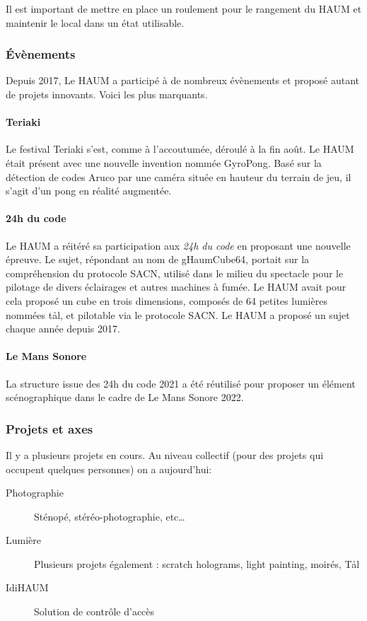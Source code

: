 \documentclass[11pt]{article}
\begin{document}
Il est important de mettre en place un roulement pour le rangement du HAUM et maintenir le local dans un état utilisable.

\subsubsection{Évènements}

Depuis 2017, Le HAUM a participé à de nombreux évènements et proposé autant de
projets innovants. Voici les plus marquants.

\paragraph{Teriaki} Le festival Teriaki s'est, comme à l'accoutumée, déroulé à la fin
août. Le HAUM était présent avec une nouvelle invention nommée GyroPong. Basé sur la détection de codes Aruco par une caméra située en hauteur du terrain de jeu, il s'agit d'un pong en réalité augmentée.

\paragraph{24h du code} Le HAUM a réitéré sa participation aux \textit{24h du code} en proposant
une nouvelle épreuve. Le sujet, répondant au nom de gHaumCube64, portait sur la compréhension du protocole SACN, utilisé dans le milieu du spectacle pour le pilotage de divers éclairages et autres machines à fumée.
Le HAUM avait pour cela proposé un cube en trois dimensions, composés de 64 petites lumières nommées tål, et pilotable via le protocole SACN. Le HAUM a proposé un sujet chaque année depuis 2017.

\paragraph{Le Mans Sonore} La structure issue des 24h du code 2021 a été réutilisé pour proposer un élément scénographique dans le cadre de Le Mans Sonore 2022.

\subsubsection{Projets et axes}

Il y a plusieurs projets en cours. Au niveau collectif (pour des projets qui occupent
quelques personnes) on a aujourd'hui:

\begin{description}
	\item[Photographie] Sténopé, stéréo-photographie, etc\ldots
	\item[Lumière] Plusieurs projets également : scratch holograms, light painting, moirés, Tål
	\item[IdiHAUM\footnotemark] Solution de contrôle d'accès
\end{description}
\end{document}
